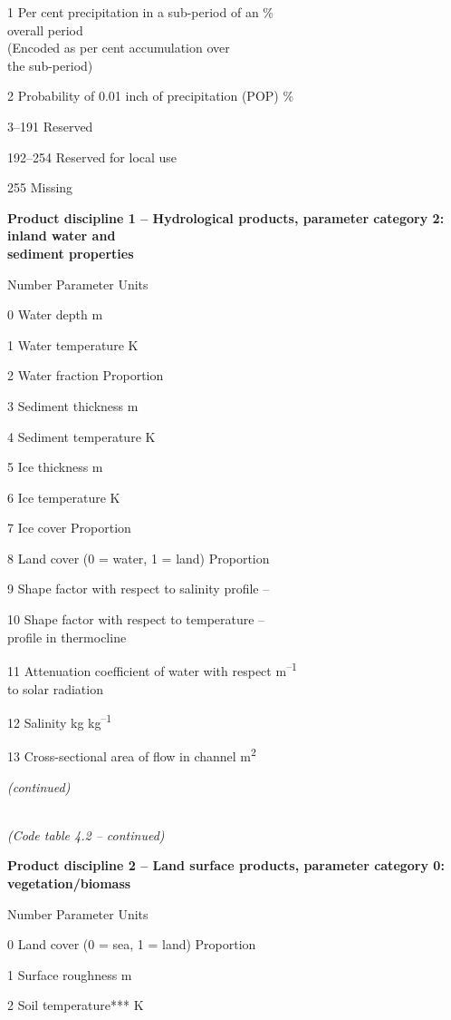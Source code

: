 1 Per cent precipitation in a sub-period of an \%\\
overall period\\
(Encoded as per cent accumulation over\\
the sub-period)

2 Probability of 0.01 inch of precipitation (POP) \%

3--191 Reserved

192--254 Reserved for local use

255 Missing

\textbf{Product discipline 1 -- Hydrological products, parameter category 2: inland water and\\
sediment properties}

Number Parameter Units

0 Water depth m

1 Water temperature K

2 Water fraction Proportion

3 Sediment thickness m

4 Sediment temperature K

5 Ice thickness m

6 Ice temperature K

7 Ice cover Proportion

8 Land cover (0 = water, 1 = land) Proportion

9 Shape factor with respect to salinity profile --

10 Shape factor with respect to temperature --\\
profile in thermocline

11 Attenuation coefficient of water with respect m\textsuperscript{--1}\\
to solar radiation

12 Salinity kg kg\textsuperscript{--1}

13 Cross-sectional area of flow in channel m\textsuperscript{2}

\emph{(continued)}

\emph{\\
(Code table 4.2 -- continued)}

\textbf{Product discipline 2 -- Land surface products, parameter category 0: vegetation/biomass}

Number Parameter Units

0 Land cover (0 = sea, 1 = land) Proportion

1 Surface roughness m

2 Soil temperature*** K

